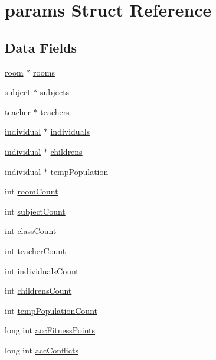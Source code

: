 \hypertarget{structparams}{}\section{params Struct Reference}
\label{structparams}
\subsection*{Data Fields}
\begin{DoxyCompactItemize}
\item 
\hyperlink{structroom}{room} $\ast$ \hyperlink{structparams_a90276c18a08cf33875cf493a4cdaa804}{rooms}
\item 
\hyperlink{structsubject}{subject} $\ast$ \hyperlink{structparams_ac0065089e5d0a97eab579cb4c6d7b81e}{subjects}
\item 
\hyperlink{structteacher}{teacher} $\ast$ \hyperlink{structparams_a97805952f15a81f9f4555ccf10e03ace}{teachers}
\item 
\hyperlink{structindividual}{individual} $\ast$ \hyperlink{structparams_a34fb92547357a1c7f92c3a6fabb2f80a}{individuals}
\item 
\hyperlink{structindividual}{individual} $\ast$ \hyperlink{structparams_abf705e1aa269afb40b47480fe463009f}{childrens}
\item 
\hyperlink{structindividual}{individual} $\ast$ \hyperlink{structparams_af22352163e1202f216654fdb35c5870a}{temp\+Population}
\item 
int \hyperlink{structparams_a90c3ccdd5d149c3fa002c1bb5bde0a20}{room\+Count}
\item 
int \hyperlink{structparams_ac4fe83020d0e3e589c5bbdaee56ea773}{subject\+Count}
\item 
int \hyperlink{structparams_ab24cae7eb61eafa1eab4b60a637dcd54}{class\+Count}
\item 
int \hyperlink{structparams_a2039ccbb20de4e0c03414b44da9687a6}{teacher\+Count}
\item 
int \hyperlink{structparams_aeca69d2fb21ed26b662e49d760c2e332}{individuals\+Count}
\item 
int \hyperlink{structparams_a4ba2f1442d3c206a25d4621420d892db}{childrens\+Count}
\item 
int \hyperlink{structparams_a9af1335fe713a9463db9a4cfa7040504}{temp\+Population\+Count}
\item 
long int \hyperlink{structparams_aa9b36381502ef09962f85670e29a9b75}{acc\+Fitness\+Points}
\item 
long int \hyperlink{structparams_a6d6078bdcb51ea92e024befc47fbe3b0}{acc\+Conflicts}

\end{DoxyCompactItemize}
